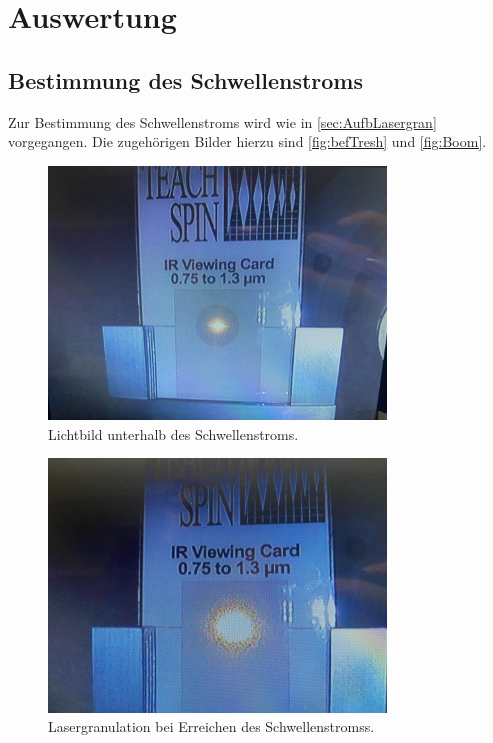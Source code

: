 \section{Auswertung}
\label{sec:Auswertung}

%
\subsection{Bestimmung des Schwellenstroms}
\label{sec:Ausw1}
Zur Bestimmung des Schwellenstroms wird wie in \autoref{sec:AufbLasergran} vorgegangen. Die zugehörigen Bilder hierzu sind \autoref{fig:befTresh} und \autoref{fig:Boom}.

\begin{figure}
    \centering
        \includegraphics[width=0.8\textwidth]{beforeThreshold.jpeg}
        \caption{Lichtbild unterhalb des Schwellenstroms.}
        \label{fig:befTresh} 
\end{figure}
\begin{figure}
    \centering
        \includegraphics[width=0.8\textwidth]{Lasergranulation.jpeg}
        \caption{Lasergranulation bei Erreichen des Schwellenstromss.}
        \label{fig:Boom} 
\end{figure}

